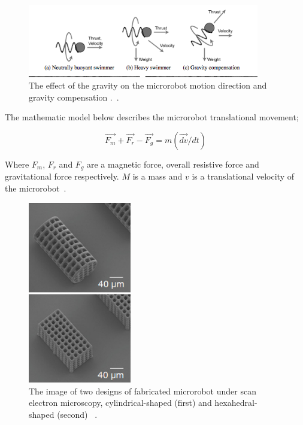\documentclass[a4paper,11pt]{article}
\begin{document}
\begin{sloppypar}
\begin{figure}
  \centering
    \includegraphics[width=0.9\textwidth]{11}
  \caption{The effect of the gravity on the microrobot motion direction and gravity compensation .~\citep{mahoney2011velocity}.}
  \label{11}
\end{figure}


The mathematic model below describes the microrobot translational movement;

\begin{equation}
  \overrightarrow{F_m }+ \overrightarrow{F_r} - \overrightarrow{F_g} = m(\overrightarrow{dv}/dt)
\label{eq:4}
\end{equation}

Where $F_m$, $F_r$ and $F_g$ are a magnetic force, overall resistive force and gravitational force respectively. 
$M$ is a mass and $v$ is a translational velocity of the microrobot~\citep{kim2013fabrication}.  


\begin{figure}
  \begin{center}
  \centering
    \includegraphics[width=0.4\textwidth]{4}
  \caption{The image of two designs of fabricated microrobot under scan electron microscopy, cylindrical-shaped (first)
and hexahedral-shaped (second) ~\citep{kim2013fabrication}.}
  \label{ref4}
\end{center}
\end{figure}





\end{sloppypar}
\end{document}
